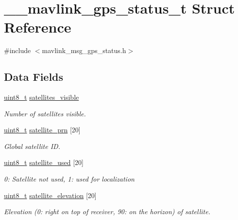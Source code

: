 \hypertarget{struct____mavlink__gps__status__t}{\section{\-\_\-\-\_\-mavlink\-\_\-gps\-\_\-status\-\_\-t Struct Reference}
\label{struct____mavlink__gps__status__t}
}


{\ttfamily \#include $<$mavlink\-\_\-msg\-\_\-gps\-\_\-status.\-h$>$}

\subsection*{Data Fields}
\begin{DoxyCompactItemize}
\item 
\hyperlink{stdint_8h_aba7bc1797add20fe3efdf37ced1182c5}{uint8\-\_\-t} \hyperlink{struct____mavlink__gps__status__t_aaf907a0b7ca1bf692b59b3c07269a72d}{satellites\-\_\-visible}
\begin{DoxyCompactList}\small\item\em Number of satellites visible. \end{DoxyCompactList}\item 
\hyperlink{stdint_8h_aba7bc1797add20fe3efdf37ced1182c5}{uint8\-\_\-t} \hyperlink{struct____mavlink__gps__status__t_a1a615b66354df8f0bfb0c269251b1f21}{satellite\-\_\-prn} \mbox{[}20\mbox{]}
\begin{DoxyCompactList}\small\item\em Global satellite I\-D. \end{DoxyCompactList}\item 
\hyperlink{stdint_8h_aba7bc1797add20fe3efdf37ced1182c5}{uint8\-\_\-t} \hyperlink{struct____mavlink__gps__status__t_a84d55d0f78f60eecf76ee27767a80695}{satellite\-\_\-used} \mbox{[}20\mbox{]}
\begin{DoxyCompactList}\small\item\em 0\-: Satellite not used, 1\-: used for localization \end{DoxyCompactList}\item 
\hyperlink{stdint_8h_aba7bc1797add20fe3efdf37ced1182c5}{uint8\-\_\-t} \hyperlink{struct____mavlink__gps__status__t_aa0df643ba0353ad8affab5768675b9ea}{satellite\-\_\-elevation} \mbox{[}20\mbox{]}
\begin{DoxyCompactList}\small\item\em Elevation (0\-: right on top of receiver, 90\-: on the horizon) of satellite. \end{DoxyCompactList}\item 

\end{DoxyCompactItemize}
